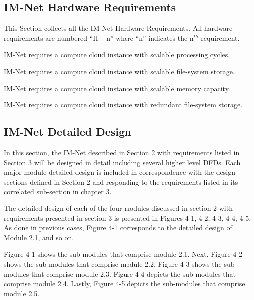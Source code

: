 \documentclass[letterpaper,12pt]{article}
\newcounter{qcounter}							%
\newcommand{\Section}[1]{\section{#1} \setcounter{figure}{0}}
\begin{document}
{\textcolor{subsection}{\subsection{IM-Net Hardware Requirements}}

This Section collects all the IM-Net Hardware Requirements. All hardware requirements are numbered ``H -- n'' where ``n'' indicates the n${}^{th}$ requirement.

\begin{list}{H -- :~}{}

\item IM-Net requires a compute cloud instance with scalable processing cycles.

\item IM-Net requires a compute cloud instance with scalable file-system storage.

\item IM-Net requires a compute cloud instance with scalable memory capacity.

\item IM-Net requires a compute cloud instance with redundant file-system storage.

\end{list}

\eject

\textcolor{section}{\Section{IM-Net Detailed Design}}

In this section, the IM-Net described in Section 2 with requirements listed in Section 3 will be designed in detail including several higher level DFDs. Each major module detailed design is included in correspondence with the design sections defined in Section 2 and responding to the requirements listed in its correlated sub-section in chapter 3.

The detailed design of each of the four modules discussed in section 2 with requirements presented in section 3 is presented in Figures 4-1, 4-2, 4-3, 4-4, 4-5. As done in previous cases, Figure 4-1 corresponds to the detailed design of Module 2.1, and so on.

Figure 4-1 shows the sub-modules that comprise module 2.1. Next, Figure 4-2 shows the  sub-modules that comprise module 2.2. Figure 4-3 shows the sub-modules that comprise module 2.3. Figure 4-4 depicts the sub-modules that comprise module 2.4. Lastly, Figure 4-5 depicts the sub-modules that comprise module 2.5.

}
\end{document}
